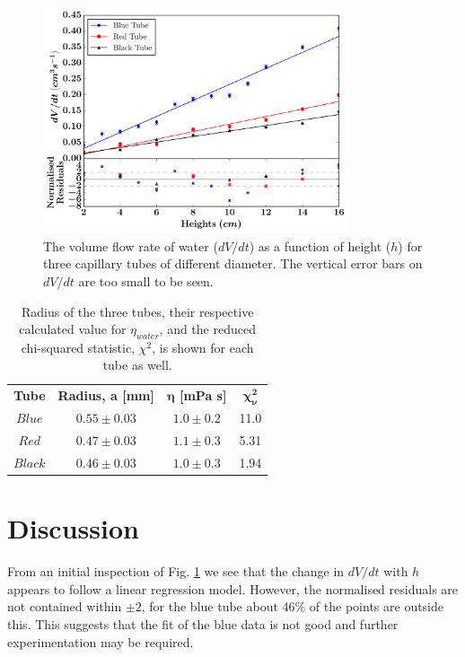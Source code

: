 \documentclass[twocolumn]{revtex4}
\newcommand{\squeezeup}{\vspace{-2.5mm}}
\begin{document}
\vspace{-1ex}
\begin{figure}[!h]
\begin{center}
\includegraphics[width=9cm]{fig1-3}
\caption[]{The volume flow rate of water ($dV/dt$) as a function of height ($h$) for three capillary tubes of different diameter. The vertical error bars on $dV/dt$ are too small to be seen.}
\label{fig:fig2}
\end{center}
\end{figure}

\squeezeup
\squeezeup
\squeezeup

\begin{table}[h!]
\centering
\begin{tabular}{c@{\hskip 20pt}c@{\hskip 20pt}c@{\hskip 20pt}c} 
 \hline
 \textbf{Tube} & \textbf{Radius, a [mm]} & \textbf{$\boldsymbol{\eta}$ [mPa {s}]} & \textbf{$\boldsymbol{\chi^2_{\nu}}$} \\ [0.5ex] 
 $Blue$ &$0.55\pm0.03$ & $1.0\pm0.2$ & 11.0 \\ 
 $Red$ & $0.47\pm0.03$ & $1.1\pm0.3$ & 5.31 \\
 $Black$ & $0.46\pm0.03$ & $1.0\pm0.3$ & 1.94 \\
 
 \hline
\end{tabular}
\caption{Radius of the three tubes, their respective calculated value for $\eta_{water}$, and the reduced chi-squared statistic, $\chi^2$, is shown for each tube as well.}
\label{table:1}
\end{table}

\squeezeup
\squeezeup

\vspace{-3ex}
\section{Discussion}
\vspace{-2ex}
From an initial inspection of Fig. \ref{fig:fig2} we see that the change in $dV/dt$ with $h$ appears to follow a linear regression model. However, the normalised residuals are not contained within $\pm 2$, for the blue tube about 46\% of the points are outside this. This suggests that the fit of the blue data is not good and further experimentation may be required. 
\end{document}
